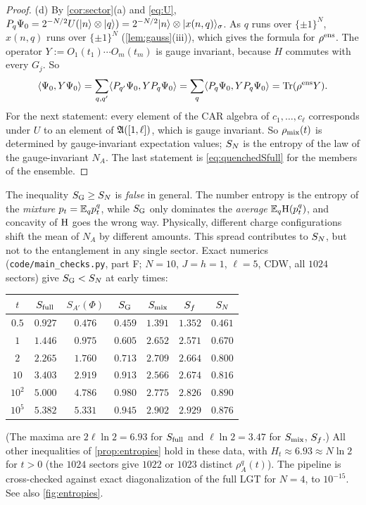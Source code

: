 \begin{proof}
(d) By \cref{cor:sector}(a) and \eqref{eq:U},
$P_q\Psi_0=2^{-N/2}U(|n\rangle\otimes|q\rangle)=2^{-N/2}|n\rangle\otimes|x(n,q)\rangle_\sigma$.  As $q$ runs over $\{\pm1\}^N$,
$x(n,q)$ runs over $\{\pm1\}^N$ (\cref{lem:gauss}(iii)), which gives the formula for $\rho^{\rm ens}$.  The operator
$Y:=O_1(t_1)\cdots O_m(t_m)$ is gauge invariant, because $H$ commutes with every $G_j$.  So
\[
  \langle\Psi_0,Y\Psi_0\rangle=\sum_{q,q'}\langle P_{q'}\Psi_0,YP_q\Psi_0\rangle=\sum_q\langle P_q\Psi_0,YP_q\Psi_0\rangle
  =\operatorname{Tr}(\rho^{\rm ens}Y).
\]
For the next statement: every element of the CAR algebra of $c_1,\dots,c_\ell$ corresponds under $U$ to an element
of $\mathfrak{A}([1,\ell])$, which is gauge invariant.  So $\rho_{\rm mix}(t)$ is determined by gauge-invariant expectation
values; $S_{N}$ is the entropy of the law of the gauge-invariant $N_A$.  The last statement is
\eqref{eq:quenchedSfull} for the members of the ensemble.
\end{proof}

\begin{remark}\label{rem:main-SGSN}
The inequality $S_{\mathrm{G}}\ge S_{N}$ is \emph{false} in general.  The number entropy is the entropy of the
\emph{mixture} $p_t=\mathbb{E}_qp^q_t$, while $S_{\mathrm{G}}$ only dominates the \emph{average} $\mathbb{E}_q\mathrm{H}(p^q_t)$, and concavity
of $\mathrm{H}$ goes the wrong way.  Physically, different charge configurations shift the mean of $N_A$ by
different amounts.  This spread contributes to $S_{N}$, but not to the entanglement in any single sector.  Exact
numerics (\texttt{code/main\_checks.py}, part F; $N=10$, $J=h=1$, $\ell=5$, CDW, all $1024$ sectors) give
$S_{\mathrm{G}}<S_{N}$ at early times:
\begin{center}
\begin{tabular}{c|cccccc}
$t$ & $S_{\mathrm{full}}$ & $S_{A'}(\Phi)$ & $S_{\mathrm{G}}$ & $S_{\mathrm{mix}}$ & $S_{f}$ & $S_{N}$\\\hline
$0.5$ & $0.927$ & $0.476$ & $0.459$ & $1.391$ & $1.352$ & $0.461$\\
$1$ & $1.446$ & $0.975$ & $0.605$ & $2.652$ & $2.571$ & $0.670$\\
$2$ & $2.265$ & $1.760$ & $0.713$ & $2.709$ & $2.664$ & $0.800$\\
$10$ & $3.403$ & $2.919$ & $0.913$ & $2.566$ & $2.674$ & $0.816$\\
$10^2$ & $5.000$ & $4.786$ & $0.980$ & $2.775$ & $2.826$ & $0.890$\\
$10^5$ & $5.382$ & $5.331$ & $0.945$ & $2.902$ & $2.929$ & $0.876$
\end{tabular}
\end{center}
(The maxima are $2\ell\ln2=6.93$ for $S_{\mathrm{full}}$ and $\ell\ln2=3.47$ for $S_{\mathrm{mix}}$, $S_{f}$.)  All other inequalities of
\cref{prop:entropies} hold in these data, with $H_t\approx6.93\approx N\ln2$ for $t>0$ (the $1024$ sectors give
$1022$ or $1023$ distinct $\rho^q_A(t)$).  The pipeline is cross-checked against exact diagonalization of the full LGT for $N=4$, to
$10^{-15}$.  See also \cref{fig:entropies}.
\end{remark}

